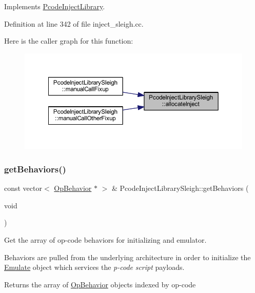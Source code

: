 Implements \mbox{\hyperlink{class_pcode_inject_library_a386a617992fcdd31d9abbf0728126686}{Pcode\+Inject\+Library}}.



Definition at line 342 of file inject\+\_\+sleigh.\+cc.

Here is the caller graph for this function\+:
\nopagebreak
\begin{figure}[H]
\begin{center}
\leavevmode
\includegraphics[width=350pt]{class_pcode_inject_library_sleigh_abb567ddc0d8f5e05d96fc87a87f72c34_icgraph}
\end{center}
\end{figure}
\mbox{\label{class_pcode_inject_library_sleigh_a878ef6bdf58bd19fa82318248836b3d8}} 
\subsubsection{\texorpdfstring{getBehaviors()}{getBehaviors()}}
{\footnotesize\ttfamily const vector$<$ \mbox{\hyperlink{class_op_behavior}{Op\+Behavior}} $\ast$ $>$ \& Pcode\+Inject\+Library\+Sleigh\+::get\+Behaviors (\begin{DoxyParamCaption}\item[{void}]{ }\end{DoxyParamCaption})\hspace{0.3cm}{\ttfamily [virtual]}}



Get the array of op-\/code behaviors for initializing and emulator. 

Behaviors are pulled from the underlying architecture in order to initialize the \mbox{\hyperlink{class_emulate}{Emulate}} object which services the {\itshape p-\/code} {\itshape script} payloads. \begin{DoxyReturn}{Returns}
the array of \mbox{\hyperlink{class_op_behavior}{Op\+Behavior}} objects indexed by op-\/code 
\end{DoxyReturn}


